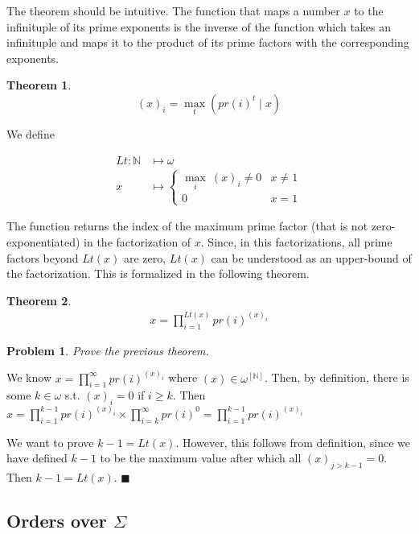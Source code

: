 \documentclass[a4paper, 12pt]{article}
\newtheorem{problem}{Problem}
\newtheorem{theorem}{Theorem}
\newtheorem{problem}{Problem}
\newtheorem{theorem}{Theorem}
\begin{document}
The theorem should be intuitive. The function that maps a number $x$ to the
infinituple of its prime exponents is the inverse of the function which takes an
infinituple and maps it to the product of its prime factors with the
corresponding exponents.

\begin{theorem}
    $$(x)_i = \max_{t} \left( pr(i)^{t} \mid x \right) $$
\end{theorem}

We define 

\begin{align*}
    Lt : \mathbb{N} &\mapsto \omega \\ 
    x &\mapsto \begin{cases}
        \max_{i} ~ (x)_i \neq 0 & x \neq 1 \\ 
        0 & x = 1
    \end{cases}
\end{align*}

The function returns the index of the maximum prime factor (that is not
zero-exponentiated) in the factorization of $x$. Since, in this factorizations,
all prime factors beyond $Lt(x)$ are zero, $Lt(x)$ can be understood as an
upper-bound of the factorization. This is formalized in the following theorem.

\begin{theorem}
    \begin{align*}
        x = \prod_{i=1}^{Lt(x)}  pr(i)^{(x)_i}
    \end{align*}
\end{theorem}

\begin{problem}
    Prove the previous theorem.
\end{problem}

We know $x = \prod_{i=1}^{\infty} pr(i)^{(x)_i}  $ where $(x) \in
\omega^{[\mathbb{N}]}$. Then, by definition, there is some $k \in \omega$ s.t. $(x)_i = 0$
if $i \geq k$. Then $x = \prod_{i=1}^{k - 1} pr(i)^{(x)_i} \times \prod_{i=k}^{\infty}
pr(i)^{0} = \prod_{i=1}^{k-1} pr(i)^{(x)_i}     $

We want to prove $k - 1 = Lt(x)$. However, this follows from definition, since
we have defined $k - 1$ to be the maximum value after which all $(x)_{j > k -1}
= 0$. Then $k - 1 = Lt(x)$. $\blacksquare$


\subsection{Orders over $\Sigma$}
\end{document}
